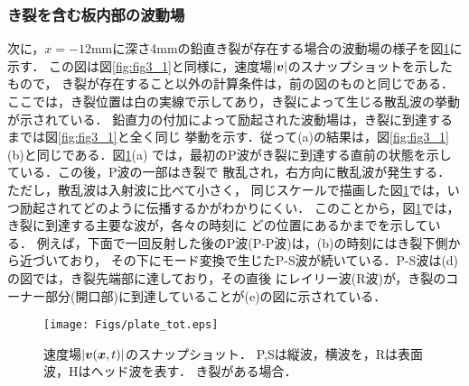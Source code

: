 \subsubsection{き裂を含む板内部の波動場}
次に，$x=-12$mmに深さ4mmの鉛直き裂が存在する場合の波動場の様子を図\ref{fig:fig3_2}に示す．
この図は図\ref{fig:fig3_1}と同様に，速度場$|\mbox{\boldmath $v$}|$のスナップショットを示したもので，
き裂が存在すること以外の計算条件は，前の図のものと同じである．
ここでは，き裂位置は白の実線で示してあり，き裂によって生じる散乱波の挙動が示されている．
鉛直力の付加によって励起された波動場は，き裂に到達するまでは図\ref{fig:fig3_1}と全く同じ
挙動を示す．従って(a)の結果は，図\ref{fig:fig3_1}(b)と同じである．図\ref{fig:fig3_2}(a)
では，最初のP波がき裂に到達する直前の状態を示している．この後，P波の一部はき裂で
散乱され，右方向に散乱波が発生する．ただし，散乱波は入射波に比べて小さく，
同じスケールで描画した図\ref{fig:fig3_2}では，いつ励起されてどのように伝播するかがわかりにくい．
このことから，図\ref{fig:fig3_2}では，き裂に到達する主要な波が，各々の時刻に
どの位置にあるかまでを示している．
例えば，下面で一回反射した後のP波(P-P波)は，(b)の時刻にはき裂下側から近づいており，
その下にモード変換で生じたP-S波が続いている．P-S波は(d)の図では，き裂先端部に達しており，その直後
にレイリー波(R波)が，き裂のコーナー部分(開口部)に到達していることが(e)の図に示されている．
\begin{figure}[h]
	\begin{center}
	\texttt{[image: Figs/plate\_tot.eps]} 
	\end{center}
	\caption{
		速度場$|\mbox{\boldmath $v$}(\mbox{\boldmath $x$},t)|$のスナップショット．
		P,Sは縦波，横波を，Rは表面波，Hはヘッド波を表す．
		き裂がある場合．
	} 
	\label{fig:fig3_2}
\end{figure}

